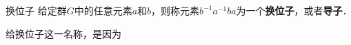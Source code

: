 
\begin{definition}{换位子}\label{CmtGrp_def1}
给定群$G$中的任意元素$a$和$b$，则称元素$b^{-1}a^{-1}ba$为一个\textbf{换位子}，或者\textbf{导子}．
\end{definition}

给换位子这一名称，是因为














